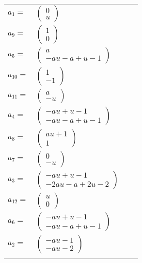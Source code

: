 \documentclass[1p]{elsarticle_modified}
\theoremstyle{definition}
\begin{document}
\begin{tabular}{m{7pt} m{180pt} m{7pt} m{180pt} }
\flushright $a_{1}=$&$\begin{pmatrix}0\\u\end{pmatrix}$ \\
\flushright $a_{9}=$&$\begin{pmatrix}1\\0\end{pmatrix}$ \\
\flushright $a_{5}=$&$\begin{pmatrix}a\\- a u- a+u-1\end{pmatrix}$ \\
\flushright $a_{10}=$&$\begin{pmatrix}1\\-1\end{pmatrix}$ \\
\flushright $a_{11}=$&$\begin{pmatrix}a\\- u\end{pmatrix}$ \\
\flushright $a_{4}=$&$\begin{pmatrix}- a u+u-1\\- a u- a+u-1\end{pmatrix}$ \\
\flushright $a_{8}=$&$\begin{pmatrix}a u+1\\1\end{pmatrix}$ \\
\flushright $a_{7}=$&$\begin{pmatrix}0\\- u\end{pmatrix}$ \\
\flushright $a_{3}=$&$\begin{pmatrix}- a u+u-1\\-2 a u- a+2 u-2\end{pmatrix}$ \\
\flushright $a_{12}=$&$\begin{pmatrix}u\\0\end{pmatrix}$ \\
\flushright $a_{6}=$&$\begin{pmatrix}- a u+u-1\\- a u- a+u-1\end{pmatrix}$ \\
\flushright $a_{2}=$&$\begin{pmatrix}- a u-1\\- a u-2\end{pmatrix}$\\&\end{tabular}
\end{document}
